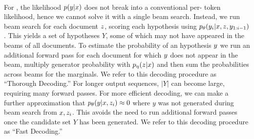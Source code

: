 \paragraph{\raganswer{}} 
For \raganswer{}, the likelihood $p(y|x)$ does not break into a conventional per- token likelihood, hence we cannot solve it with a single beam search. Instead, we run beam search for each  document $z$, scoring each hypothesis using $p_{\theta}(y_i|x, z, y_{1:i-1})$. This yields a set of hypotheses $Y$, some of which may not have appeared in the beams of all documents. To estimate the probability of an hypothesis $y$ 
we run an additional forward pass for each document \doc{} for which $y$ does not appear in the beam, multiply generator probability with $p_{\eta}(z|x)$ and then sum the probabilities across beams for the marginals. We refer to this decoding procedure as ``Thorough Decoding.''
For longer output sequences, $|Y|$ can become large, requiring many forward passes. For more efficient decoding, we can make a further approximation that $p_{\theta}(y|x, z_i) \approx 0$ where $y$ was not generated during beam search from $x, z_i$. This avoids the need to run additional forward passes once the candidate set $Y$ has been generated. We refer to this decoding procedure as ``Fast Decoding.''

